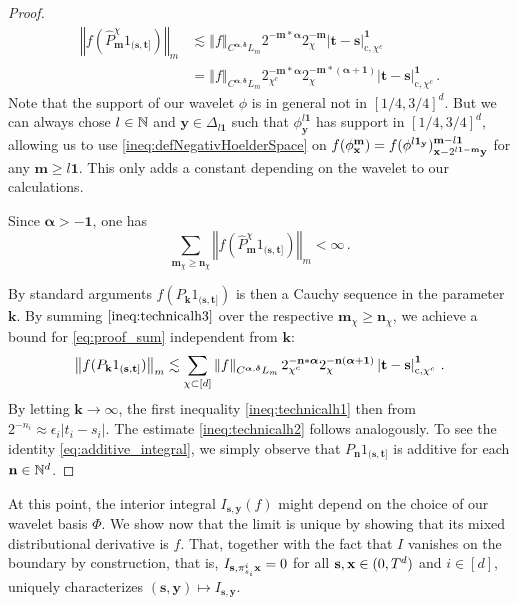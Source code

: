 \documentclass[12pt]{article}
\numberwithin{equation}{section}
\theoremstyle{plain}
\theoremstyle{definition}
\newcommand{\abs}[1]{\left\vert #1 \right\vert}
\newcommand{\norm}[1]{\left\Vert #1\right\Vert}
\def\fk{\mathbf k}\def\fl{\mathbf l}
\def\fm{\mathbf m}\def\fn{\mathbf n}\def\fN{\mathbf N}
\def\fs{\mathbf s}\def\ft{\mathbf t}
\def\fy{\mathbf y}\def\fz{\mathbf z}
\def\falpha{{\boldsymbol\alpha}}
\def\fdelta{{\boldsymbol\delta}}
\def\fone{{\boldsymbol 1}}
\begin{document}
\begin{proof}
    \begin{equation}\label{ineq:technicalh3}
    \begin{split}
        \norm{f(\hat P_\fm^\chi 1_{(\fs,\ft]})}_m&\lesssim \norm{f}_{C^{\falpha,\fdelta}L_m} 2^{-\fm*\falpha}2^{-\fm}_\chi\abs{\ft-\fs}^{\fone}_{\text{c},\chi^c}\\&= \norm{f}_{C^{\falpha,\fdelta}L_m} 2^{-\fm*\falpha}_{\chi^c}2^{-\fm*(\falpha+\fone)}_\chi\abs{\ft-\fs}^{\fone}_{\text{c},\chi^c}\,.
    \end{split}
    \end{equation}
    Note that the support of our wavelet $\phi$ is in general not in $[1/4,3/4]^d$. But we can always chose  $l\in\mathbb{N}$ and $\fy\in\Delta_{l\fone}$ such that $\phi^{l\fone}_\fy$ has support in $[1/4,3/4]^d$, allowing us to use \eqref{ineq:defNegativHoelderSpace} on $f(\phi^\fm_\fx) = f(\phi^{l\fone_\fy})^{\fm-l\fone}_{\fx-2^{l\fone-\fm}\fy}$ for any $\fm\ge l\fone$. This only adds a constant depending on the wavelet to our calculations. 
    
    Since  $\falpha>-\fone $, one has 
    \[\sum_{\fm_\chi\ge\fn_\chi}\norm{f(\hat P_\fm^\chi 1_{(\fs,\ft]})}_m<\infty\,.\]  

    By standard arguments $f(P_\fk 1_{(\fs,\ft]})$ is then a Cauchy sequence in the parameter $\fk$. By summing $\eqref{ineq:technicalh3}$ over the respective $\fm_\chi\ge\fn_\chi$, we achieve a bound for \eqref{eq:proof_sum} independent from $\fk$:
    \[
        \norm{f(P_\fk  1_{(\fs,\ft]}) }_m \lesssim \sum_{\chi\subset[d]}\norm{f}_{C^{\falpha,\fdelta}L_m} 2^{-\fn*\falpha}_{\chi^c}2^{-\fn(\falpha+\fone)}_\chi\abs{\ft-\fs}_{\text c,\chi^c}^\fone\,.
    \]
    By letting $\fk\to\infty$, the first inequality \eqref{ineq:technicalh1} then from $2^{-n_i} \approx \epsilon_i\abs{t_i-s_i}$. The estimate \eqref{ineq:technicalh2} follows analogously. To see the identity \eqref{eq:additive_integral}, we simply observe that $P_\fn1_{(\fs,\ft]}$ is additive for each $\fn\in\bN^d$.
\end{proof}

At this point, the interior integral
$I_{\fs, \fy}(f)$ might depend on the choice of our wavelet basis $\Phi$. We show now  that the limit is unique by showing that its mixed distributional derivative is $f$. That, together with the fact that $I$ vanishes on the boundary by construction, that is, $I_{\fs,\pi^i_{s_i}\fx} = 0$ for all $\fs,\fx\in(0,T^d)$ and $i\in[d]$, uniquely characterizes $(\fs,\fy)\mapsto I_{\fs,\fy}$.
\end{document}
